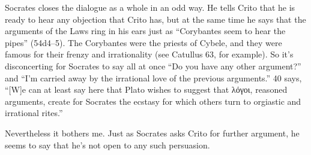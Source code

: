 \documentclass[12pt,letterpaper]{article}
\begin{document}
Socrates closes the dialogue as a whole in an odd way.
He tells Crito that he is ready to hear any objection that Crito has, but at the same time he says that the arguments of the Laws ring in his ears just as ``Corybantes seem to hear the pipes'' (54d4--5).
The Corybantes were the priests of Cybele, and they were famous for their frenzy and irrationality (see Catullus 63, for example).
So it's disconcerting for Socrates to say all at once ``Do you have any other argument?'' and ``I'm carried away by the irrational love of the previous arguments.''
\cite{rose-crito-1983} 40 says, ``[W]e can at least say here that Plato wishes to suggest that \textgreek{λόγοι}, reasoned arguments, create for Socrates the ecstasy for which others turn to orgiastic and irrational rites.''

Nevertheless it bothers me.
Just as Socrates asks Crito for further argument, he seems to say that he's not open to any such persuasion.

\newpage
\pagestyle{references}
\nocite{burnet1903}
\printbibliography[filter=sources,title={Ancient Sources: Editions, Translations, Commentaries}]
\printbibliography[filter=secondary,title=Secondary Literature]
\end{document}
